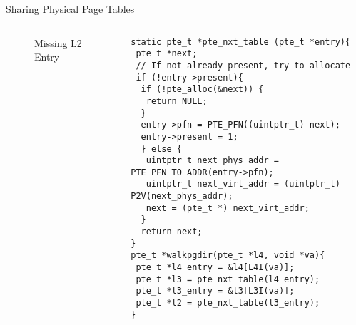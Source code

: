 \documentclass[aspectratio=169,xcolor=dvipsnames]{beamer}
\begin{document}
\begin{frame}[fragile]{Sharing Physical Page Tables}
\begin{columns}[c]
\begin{figure}
\begin{tikzpicture}[x=0.75pt,y=0.75pt,yscale=-0.5,xscale=0.5]
\end{tikzpicture}
        \caption{Missing L2 Entry}
        \label{fig:enter-label}
    \end{figure}
\begin{lstlisting}[style=CStyleNum, basicstyle=\tiny]
static pte_t *pte_nxt_table (pte_t *entry){
 pte_t *next;
 // If not already present, try to allocate
 if (!entry->present){
  if (!pte_alloc(&next)) {
   return NULL;
  }
  entry->pfn = PTE_PFN((uintptr_t) next);
  entry->present = 1;
  } else {
   uintptr_t next_phys_addr = PTE_PFN_TO_ADDR(entry->pfn);        
   uintptr_t next_virt_addr = (uintptr_t) P2V(next_phys_addr);
   next = (pte_t *) next_virt_addr;
  }
  return next;
}   
pte_t *walkpgdir(pte_t *l4, void *va){ 
 pte_t *l4_entry = &l4[L4I(va)];
 pte_t *l3 = pte_nxt_table(l4_entry);
 pte_t *l3_entry = &l3[L3I(va)];
 pte_t *l2 = pte_nxt_table(l3_entry);
}

\end{lstlisting}
\end{columns}
\end{frame}
\end{document}
